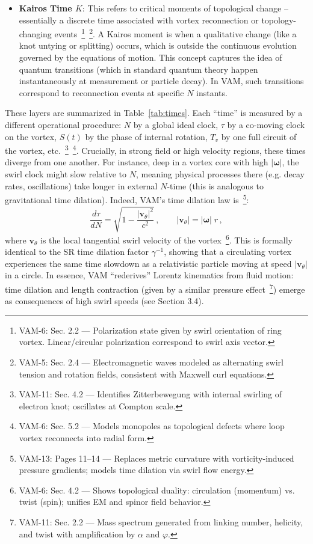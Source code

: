 \documentclass[a4paper,12pt]{article}
\begin{document}
\begin{itemize}
        \item \textbf{Kairos Time $K$}: This refers to critical moments of topological change -- essentially a discrete time associated with vortex reconnection or topology-changing events~\footnote{VAM-6: Sec. 2.2 — Polarization state given by swirl orientation of ring vortex. Linear/circular polarization correspond to swirl axis vector.}~\footnote{VAM-5: Sec. 2.4 — Electromagnetic waves modeled as alternating swirl tension and rotation fields, consistent with Maxwell curl equations.}. A Kairos moment is when a qualitative change (like a knot untying or splitting) occurs, which is outside the continuous evolution governed by the equations of motion. This concept captures the idea of quantum transitions (which in standard quantum theory happen instantaneously at measurement or particle decay). In VAM, such transitions correspond to reconnection events at specific $N$ instants.
    \end{itemize}

    These layers are summarized in Table~\ref{tab:times}. Each “time” is measured by a different operational procedure: $N$ by a global ideal clock, $\tau$ by a co-moving clock on the vortex, $S(t)$ by the phase of internal rotation, $T_v$ by one full circuit of the vortex, etc.~\footnote{VAM-11: Sec. 4.2 — Identifies Zitterbewegung with internal swirling of electron knot; oscillates at Compton scale.}~\footnote{VAM-6: Sec. 5.2 — Models monopoles as topological defects where loop vortex reconnects into radial form.}. Crucially, in strong field or high velocity regions, these times diverge from one another. For instance, deep in a vortex core with high $|\boldsymbol{\omega}|$, the swirl clock might slow relative to $N$, meaning physical processes there (e.g. decay rates, oscillations) take longer in external $N$-time (this is analogous to gravitational time dilation). Indeed, VAM’s time dilation law is~\footnote{VAM-13: Pages 11–14 — Replaces metric curvature with vorticity-induced pressure gradients; models time dilation via swirl flow energy.}:
    \begin{equation}
        \frac{d\tau}{dN} = \sqrt{1 - \frac{|\mathbf{v}_\theta|^2}{c^2}}\,,
        \qquad |\mathbf{v}_\theta| = |\boldsymbol{\omega}|\;r\,,
        \label{eq:time-dilation}
    \end{equation}
    where $\mathbf{v}_\theta$ is the local tangential swirl velocity of the vortex~\footnote{VAM-6: Sec. 4.2 — Shows topological duality: circulation (momentum) vs. twist (spin); unifies EM and spinor field behavior.}. This is formally identical to the SR time dilation factor $\gamma^{-1}$, showing that a circulating vortex experiences the same time slowdown as a relativistic particle moving at speed $|\mathbf{v}_\theta|$ in a circle. In essence, VAM “rederives” Lorentz kinematics from fluid motion: time dilation and length contraction (given by a similar pressure effect~\footnote{VAM-11: Sec. 2.2 — Mass spectrum generated from linking number, helicity, and twist with amplification by $\alpha$ and $\varphi$.}) emerge as consequences of high swirl speeds (see Section 3.4).
\end{document}
